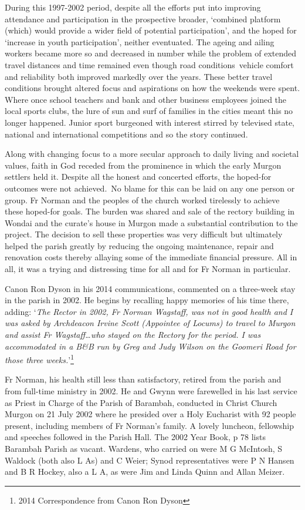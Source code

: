During this 1997-2002 period, despite all the efforts put into improving attendance and participation in the prospective broader, `combined platform (which) would provide a wider field of potential participation', and the hoped for `increase in youth participation', neither eventuated. The ageing and ailing workers became more so and decreased in number while the problem of extended travel distances and time remained even though road conditions~vehicle comfort and reliability both improved markedly over the years. These better travel conditions brought altered focus and aspirations on how the weekends were spent. Where once school teachers and bank and other business employees joined the local sports clubs, the lure of sun and surf of families in the cities meant this no longer happened. Junior sport burgeoned with interest stirred by televised state, national and international competitions and so the story continued.



Along with changing focus to a more secular approach to daily living and societal values, faith in God receded from the prominence in which the early Murgon settlers held it. Despite all the honest and concerted efforts, the hoped-for outcomes were not achieved.~No blame for this can be laid on any one person or group. Fr Norman and the peoples of the church worked tirelessly to achieve these hoped-for goals. The burden was shared and sale of the rectory building in Wondai and the curate's house in Murgon made a substantial contribution to the project. The decision to sell these properties was very difficult but ultimately helped the parish greatly by reducing the ongoing maintenance, repair and renovation costs thereby allaying some of the immediate financial pressure. All in all, it was a trying and distressing time for all and for Fr Norman in particular.



Canon Ron Dyson in his 2014 communications, commented on a three-week stay in the parish in 2002. He begins by recalling happy memories of his time there, adding: `\emph{The Rector in 2002, Fr Norman Wagstaff, was not in good health and I was asked by Archdeacon Irvine Scott (Appointee of Locums) to travel to Murgon and assist Fr Wagstaff\ldots who stayed on the Rectory for the period. I was accommodated in a B\&B run by Greg and Judy Wilson on the Goomeri Road for those three weeks.}'\footnote{2014 Correspondence from Canon Ron Dyson}


Fr Norman, his health still less than satisfactory, retired from the parish and from full-time ministry in 2002. He and Gwynn were farewelled in his last service as Priest in Charge of the Parish of Barambah, conducted in Christ Church Murgon on 21 July 2002 where he presided over a Holy Eucharist with 92 people present, including members of Fr Norman's family. A lovely luncheon, fellowship and speeches followed in the Parish Hall. The 2002 Year Book, p 78 lists Barambah Parish as vacant. Wardens, who carried on were M G McIntosh, S Waldock (both also L As) and C Weier; Synod representatives were P N Hansen and B R Hockey, also a L A, as were Jim and Linda Quinn and Allan Meizer.



